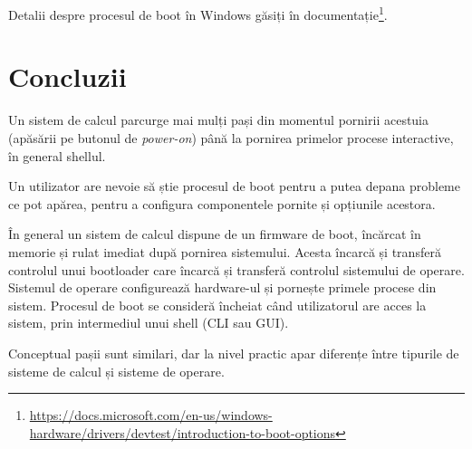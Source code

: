 Detalii despre procesul de boot în Windows găsiți în
documentație\footnote{\url{https://docs.microsoft.com/en-us/windows-hardware/drivers/devtest/introduction-to-boot-options}}.

\section{Concluzii}
\label{sec:boot:conclusion}

Un sistem de calcul parcurge mai mulți pași din momentul pornirii acestuia
(apăsării pe butonul de \textit{power-on}) până la pornirea primelor procese interactive,
în general shellul.

Un utilizator are nevoie să știe procesul de boot pentru a putea depana probleme
ce pot apărea, pentru a configura componentele pornite și opțiunile acestora.

În general un sistem de calcul dispune de un firmware de boot, încărcat în
memorie și rulat imediat după pornirea sistemului. Acesta încarcă și transferă
controlul unui bootloader care încarcă și transferă controlul sistemului de
operare. Sistemul de operare configurează hardware-ul și pornește primele
procese din sistem. Procesul de boot se consideră încheiat când utilizatorul are acces la sistem, prin intermediul unui shell (CLI sau GUI).

Conceptual pașii sunt similari, dar la nivel practic apar diferențe între
tipurile de sisteme de calcul și sisteme de operare.
